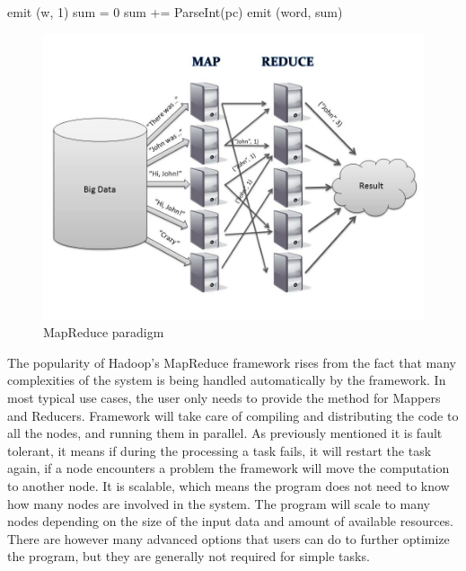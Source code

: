\documentclass[english]{tktltiki}
\begin{document}
\begin{algorithm}
\begin{algorithmic}
      		\State emit (w, 1)
   \EndFor
\EndFunction
\State 
{}
  \State sum = 0
    \State sum += ParseInt(pc)
    \State emit (word, sum)
\EndFor
\EndFunction
\end{algorithmic}
\end{algorithm}

\begin{figure}[ht!]
\centering
\includegraphics[width=130mm]{figures/mapreduce.jpg}
\caption{MapReduce paradigm}
\end{figure}

The popularity of Hadoop's MapReduce framework rises from the fact that many complexities of the system is being handled automatically by the framework. In most typical use cases, the user only needs to provide the method for Mappers and Reducers. Framework will take care of compiling and distributing the code to all the nodes, and running them in parallel. As previously mentioned it is fault tolerant, it means if during the processing a task fails, it will restart the task again, if a node encounters a problem the framework will move the computation to another node. It is scalable, which means the program does not need to know how many nodes are involved in the system. The program will scale to many nodes depending on the size of the input data and amount of available resources. There are however many advanced options that users can do to further optimize the program, but they are generally not required for simple tasks. 
\end{document}
